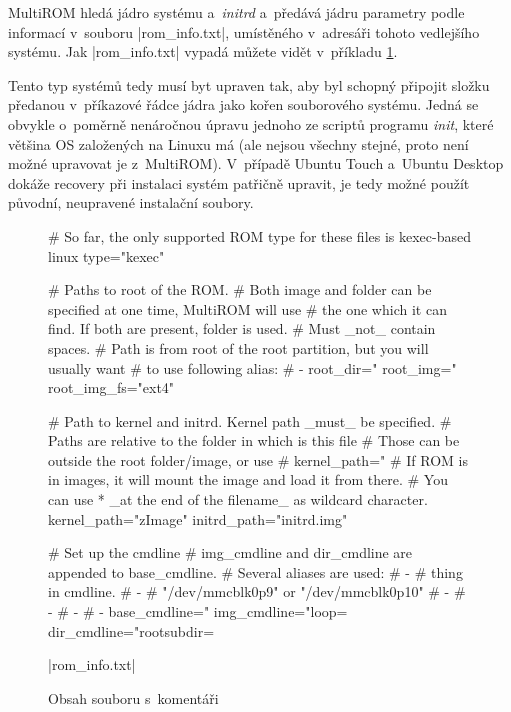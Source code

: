 \documentclass[12pt, a4paper, oneside]{article}
\newcommand{\It}{\textit}  %
\begin{document}
MultiROM hledá jádro systému a~\It{initrd} a~předává jádru parametry podle informací v~souboru |rom_info.txt|, umístěného v~adresáři tohoto vedlejšího systému. Jak |rom_info.txt| vypadá můžete vidět v~příkladu \ref{rom-info}.

Tento typ systémů tedy musí byt upraven tak, aby byl schopný připojit složku předanou v~příkazové řádce jádra jako kořen souborového systému. Jedná se obvykle o~poměrně nenáročnou úpravu jednoho ze scriptů programu \It{init}, které většina OS založených na Linuxu má (ale nejsou všechny stejné, proto není možné upravovat je z~MultiROM). V~případě Ubuntu Touch a~Ubuntu Desktop dokáže recovery při instalaci systém patřičně upravit, je tedy možné použít původní, neupravené instalační soubory.

\linespread{1.1}
\begin{figure}[H]
\begin{inicode}
# So far, the only supported ROM type for these files is kexec-based linux
type="kexec"

# Paths to root of the ROM.
# Both image and folder can be specified at one time, MultiROM will use 
# the one which it can find. If both are present, folder is used.
# Must _not_ contain spaces.
# Path is from root of the root partition, but you will usually want
# to use following alias:
# - %
root_dir="%
root_img="%
root_img_fs="ext4"

# Path to kernel and initrd. Kernel path _must_ be specified.
# Paths are relative to the folder in which is this file
# Those can be outside the root folder/image, or use %
# kernel_path="%
# If ROM is in images, it will mount the image and load it from there.
# You can use  * _at the end of the filename_ as wildcard character.
kernel_path="zImage"
initrd_path="initrd.img"

# Set up the cmdline
# img_cmdline and dir_cmdline are appended to base_cmdline.
# Several aliases are used:
#  - %
#         thing in cmdline.
#  - %
#         "/dev/mmcblk0p9" or "/dev/mmcblk0p10"
#  - %
#  - %
#  - %
#  - %
base_cmdline="%
img_cmdline="loop=%
dir_cmdline="rootsubdir=%
\end{inicode}
|rom_info.txt|
\caption{Obsah souboru \protect{} s~komentáři}
\label{rom-info}
\end{figure}
\end{document}
